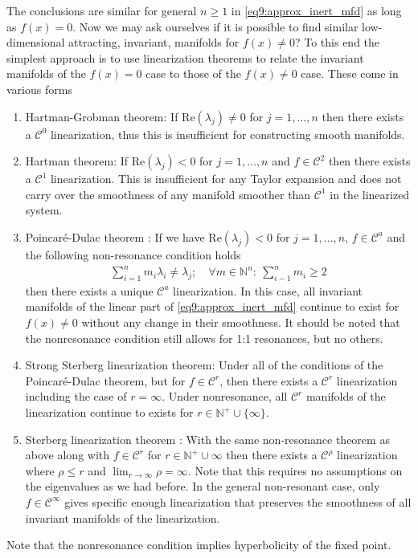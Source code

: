 The conclusions are similar for general $n\geq 1$ in \ref{eq9:approx_inert_mfd} as long as $f(x) = 0$. Now we may ask ourselves if it is possible to find similar low-dimensional attracting, invariant, manifolds for $f(x) \neq 0$? To this end the simplest approach is to use linearization theorems to relate the invariant manifolds of the $f(x)=0$ case to those of the $f(x) \neq 0$ case. These come in various forms
\begin{enumerate}
	\item Hartman-Grobman theorem: If $ \textrm{Re} (\lambda_j) \neq 0$ for $j=1,\ldots,n$ then there exists a $\mathcal{C}^{0}$ linearization, thus this is insufficient for constructing smooth manifolds.
	\item Hartman theorem: If $ \textrm{Re} (\lambda_j)<0$ for $j=1,\ldots,n$ and $f\in \mathcal{C}^{2}$ then there exists a $\mathcal{C}^{1}$ linearization. This is insufficient for any Taylor expansion and does not carry over the smoothness of any manifold smoother than $\mathcal{C}^{1}$ in the linearized system.
	\item Poincaré-Dulac theorem \cite{poincare1951}: If we have $ \textrm{Re} (\lambda_j)<0$ for $j=1,\ldots,n$, $f\in \mathcal{C}^{a}$ and the following non-resonance condition holds
		\begin{align}
			\sum_{i=1}^{n} m_i \lambda_i \neq \lambda_j;\quad \forall m\in\mathbb{N}^{n}:\ \sum_{i-1}^{n} m_{i} \geq 2
		\end{align}
		then there exists a unique $\mathcal{C}^{a}$ linearization. In this case, all invariant manifolds of the linear part of \ref{eq9:approx_inert_mfd} continue to exist for $f(x)\neq 0$ without any change in their smoothness. It should be noted that the nonresonance condition still allows for 1:1 resonances, but no others.
	\item Strong Sterberg linearization theorem: Under all of the conditions of the Poincaré-Dulac theorem, but for $f\in \mathcal{C}^{r}$, then there exists a $\mathcal{C}^{r}$ linearization including the case of $r=\infty $. Under nonresonance, all $\mathcal{C}^{r}$ manifolds of the linearization continue to exists for $r \in \mathbb{N}^{+}\cup \{\infty \}$.
	\item Sterberg linearization theorem \cite{Sterberg1957}: With the same non-resonance theorem as above along with $f\in\mathcal{C}^{r}$ for $r \in \mathbb{N}^{+}\cup \infty $ then there exists a $\mathcal{C}^{\rho}$ linearization where $\rho\leq r$ and $\lim_{r\to \infty }\rho = \infty $. Note that this requires no assumptions on the eigenvalues as we had before. In the general non-resonant case, only $f\in \mathcal{C}^{\infty }$ gives specific enough linearization that preserves the smoothness of all invariant manifolds of the linearization.  
		
\end{enumerate}
\begin{remark}[]
	Note that the nonresonance condition implies hyperbolicity of the fixed point.
\end{remark}

